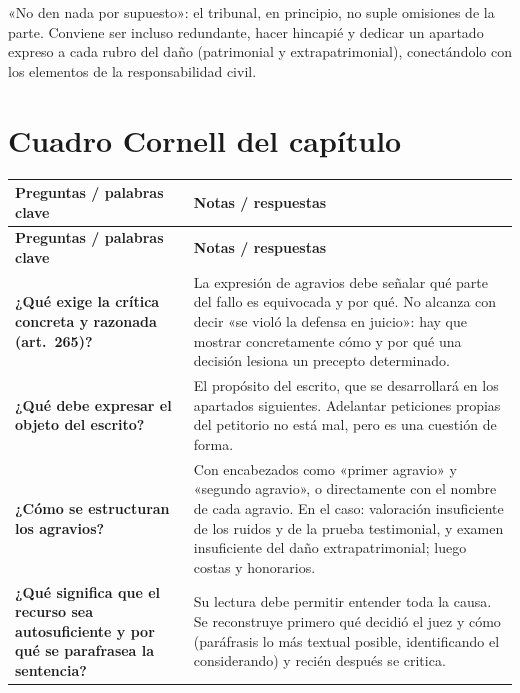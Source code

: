 \documentclass[12pt,oneside]{book}
\begin{document}
\begin{important}
«No den nada por supuesto»: el tribunal, en principio, no suple omisiones de la parte. Conviene ser incluso redundante, hacer hincapié y dedicar un apartado expreso a cada rubro del daño (patrimonial y extrapatrimonial), conectándolo con los elementos de la responsabilidad civil.
\end{important}

\section{Cuadro Cornell del capítulo}

\begin{longtable}{>{\raggedright\arraybackslash}p{}>{\raggedright\arraybackslash}p{}}
\toprule
\textbf{Preguntas / palabras clave} & \textbf{Notas / respuestas} \\
\midrule
\endfirsthead
\toprule
\textbf{Preguntas / palabras clave} & \textbf{Notas / respuestas} \\
\midrule
\endhead

\textbf{¿Qué exige la crítica concreta y razonada (art.~265)?} &
La expresión de agravios debe señalar qué parte del fallo es equivocada y por qué. No alcanza con decir «se violó la defensa en juicio»: hay que mostrar concretamente cómo y por qué una decisión lesiona un precepto determinado. \\[0.6em]

\textbf{¿Qué debe expresar el objeto del escrito?} &
El propósito del escrito, que se desarrollará en los apartados siguientes. Adelantar peticiones propias del petitorio no está mal, pero es una cuestión de forma. \\[0.6em]

\textbf{¿Cómo se estructuran los agravios?} &
Con encabezados como «primer agravio» y «segundo agravio», o directamente con el nombre de cada agravio. En el caso: valoración insuficiente de los ruidos y de la prueba testimonial, y examen insuficiente del daño extrapatrimonial; luego costas y honorarios. \\[0.6em]

\textbf{¿Qué significa que el recurso sea autosuficiente y por qué se parafrasea la sentencia?} &
Su lectura debe permitir entender toda la causa. Se reconstruye primero qué decidió el juez y cómo (paráfrasis lo más textual posible, identificando el considerando) y recién después se critica. \\[0.6em]


\end{longtable}
\end{document}
